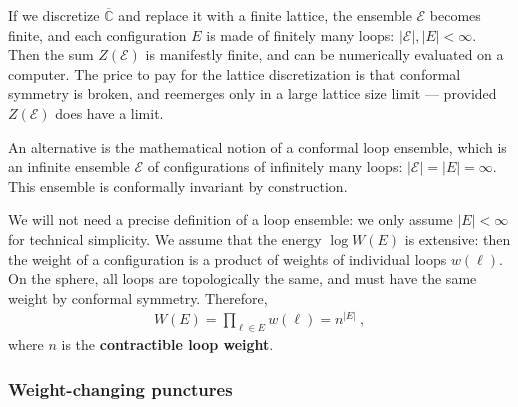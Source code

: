 \documentclass[12pt, a4paper]{article}
\newcommand{\myindex}[1]{\textbf{\boldmath #1}}
\theoremstyle{break}
\begin{document}
If we discretize $\overline{\mathbb{C}}$ and replace it with a finite lattice, the ensemble $\mathcal{E}$ becomes finite, and each configuration $E$ is made of finitely many loops: $|\mathcal{E}|, |E|<\infty$. Then the sum $Z(\mathcal{E})$ is manifestly finite, and can be numerically evaluated on a computer. The price to pay for the lattice discretization is that conformal symmetry is broken, and reemerges only in a large lattice size limit --- provided $Z(\mathcal{E})$ does have a limit. 

An alternative is the mathematical notion of a conformal loop ensemble, which is an infinite ensemble $\mathcal{E}$ of configurations of infinitely many loops: $|\mathcal{E}|=|E|=\infty$. This ensemble is conformally invariant by construction. 

We will not need a precise definition of a loop ensemble: we only assume $|E|<\infty$ for technical simplicity. We assume that the energy $\log W(E)$ is extensive: then the weight of a configuration is a product of weights of individual loops $w(\ell)$. On the sphere, all loops are topologically the same, and must have the same weight by conformal symmetry. Therefore,
\begin{align}
 W(E) = \prod_{\ell \in E } w(\ell) = n^{|E|}\ ,
 \label{woe}
\end{align}
where $n$ is the \myindex{contractible loop weight}. 


\subsubsection{Weight-changing punctures}
\end{document}
